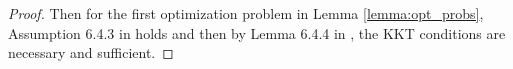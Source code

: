 \documentclass[aap,preprint]{imsart}
\theoremstyle{plain}
\theoremstyle{definition}
\begin{document}
\begin{appendix}
\begin{proof}
Then for the first optimization problem in Lemma \ref{lemma:opt_probs},  Assumption 6.4.3 in \cite{bertsekas2003convex} holds and then by Lemma 6.4.4 in \cite{bertsekas2003convex}, the KKT conditions are necessary and sufficient.
\end{proof}

\end{appendix}
\end{document}
